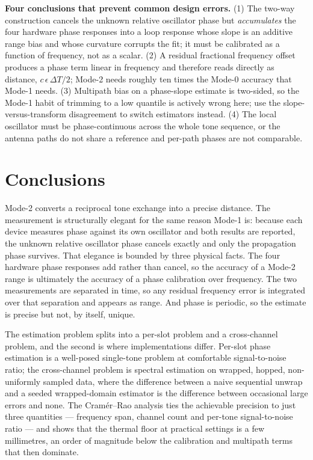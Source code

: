 \documentclass[11pt,a4paper]{article}
\begin{document}
\begin{callout}
\textbf{Four conclusions that prevent common design errors.} (1) The two-way construction cancels the
unknown relative oscillator phase but \emph{accumulates} the four hardware phase responses into a
loop response whose slope is an additive range bias and whose curvature corrupts the fit; it must be
calibrated as a function of frequency, not as a scalar. (2) A residual fractional frequency offset
produces a phase term linear in frequency and therefore reads directly as distance,
$c\,\epsilon\,\Delta T/2$; Mode-2 needs roughly ten times the Mode-0 accuracy that Mode-1 needs.
(3) Multipath bias on a phase-slope estimate is two-sided, so the Mode-1 habit of trimming to a low
quantile is actively wrong here; use the slope-versus-transform disagreement to switch estimators
instead. (4) The local oscillator must be phase-continuous across the whole tone sequence, or the
antenna paths do not share a reference and per-path phases are not comparable.
\end{callout}

\section{Conclusions}

Mode-2 converts a reciprocal tone exchange into a precise distance. The measurement is structurally
elegant for the same reason Mode-1 is: because each device measures phase against its own
oscillator and both results are reported, the unknown relative oscillator phase cancels exactly and
only the propagation phase survives. That elegance is bounded by three physical facts. The four
hardware phase responses add rather than cancel, so the accuracy of a Mode-2 range is ultimately the
accuracy of a phase calibration over frequency. The two measurements are separated in time, so any
residual frequency error is integrated over that separation and appears as range. And phase is
periodic, so the estimate is precise but not, by itself, unique.

The estimation problem splits into a per-slot problem and a cross-channel problem, and the second is
where implementations differ. Per-slot phase estimation is a well-posed single-tone problem at
comfortable signal-to-noise ratio; the cross-channel problem is spectral estimation on wrapped,
hopped, non-uniformly sampled data, where the difference between a naive sequential unwrap and a
seeded wrapped-domain estimator is the difference between occasional large errors and none. The
Cram\'er--Rao analysis ties the achievable precision to just three quantities --- frequency span,
channel count and per-tone signal-to-noise ratio --- and shows that the thermal floor at practical
settings is a few millimetres, an order of magnitude below the calibration and multipath terms that
then dominate.
\end{document}
